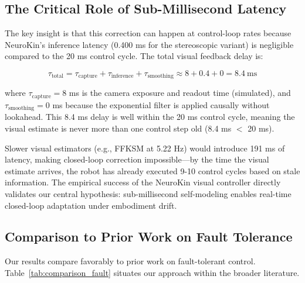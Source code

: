 ﻿\documentclass[12pt,a4paper,oneside]{report}
\begin{document}
\subsection{The Critical Role of Sub-Millisecond Latency}

The key insight is that this correction can happen at control-loop rates because NeuroKin's inference latency (0.400 ms for the stereoscopic variant) is negligible compared to the 20 ms control cycle. The total visual feedback delay is:

\begin{equation}
\tau_{\text{total}} = \tau_{\text{capture}} + \tau_{\text{inference}} + \tau_{\text{smoothing}} \approx 8 + 0.4 + 0 = 8.4\ \text{ms}
\end{equation}

where $\tau_{\text{capture}} = 8$ ms is the camera exposure and readout time (simulated), and $\tau_{\text{smoothing}} = 0$ ms because the exponential filter is applied causally without lookahead. This 8.4 ms delay is well within the 20 ms control cycle, meaning the visual estimate is never more than one control step old (8.4 ms $<$ 20 ms).

Slower visual estimators (e.g., FFKSM at 5.22 Hz) would introduce 191 ms of latency, making closed-loop correction impossible---by the time the visual estimate arrives, the robot has already executed 9-10 control cycles based on stale information. The empirical success of the NeuroKin visual controller directly validates our central hypothesis: sub-millisecond self-modeling enables real-time closed-loop adaptation under embodiment drift.

\subsection{Comparison to Prior Work on Fault Tolerance}

Our results compare favorably to prior work on fault-tolerant control. Table~\ref{tab:comparison_fault} situates our approach within the broader literature.
\end{document}

